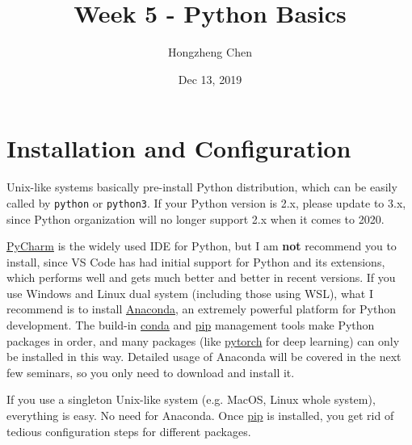 \documentclass[english]{../TexTemplate/thesis}
\title{Week 5 - Python Basics}
\author{Hongzheng Chen}
\date{Dec 13, 2019}
\begin{document}
\maketitle

\section{Installation and Configuration}
Unix-like systems basically pre-install Python distribution, which can be easily called by \verb'python' or \verb'python3'.
If your Python version is 2.x, please update to 3.x, since Python organization will no longer support 2.x when it comes to 2020.

\href{https://www.jetbrains.com/pycharm/}{PyCharm} is the widely used IDE for Python, but I am \textbf{not} recommend you to install, since VS Code has had initial support for Python and its extensions, which performs well and gets much better and better in recent versions.
If you use Windows and Linux dual system (including those using WSL), what I recommend is to install \href{https://www.anaconda.com/}{Anaconda}, an extremely powerful platform for Python development. The build-in \href{https://conda.io/en/latest/}{conda} and \href{https://pypi.org/project/pip/}{pip} management tools make Python packages in order, and many packages (like \href{https://pytorch.org/}{pytorch} for deep learning) can only be installed in this way. Detailed usage of Anaconda will be covered in the next few seminars, so you only need to download and install it.

If you use a singleton Unix-like system (e.g. MacOS, Linux whole system), everything is easy. No need for Anaconda. Once \href{https://pypi.org/project/pip/}{pip} is installed, you get rid of tedious configuration steps for different packages.
\end{document}

